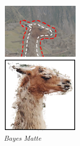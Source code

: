 \begin{figure}[H]
\begin{subfigure}{0.3\textwidth}
      \includegraphics[width=\textwidth]{gambar/gambar-2_5(c).png}
      \caption{\emph{Bayes Matte}}
    \end{subfigure}  
    \begin{subfigure}{0.3\textwidth}
      \centering{}

\end{subfigure}
\end{figure}
